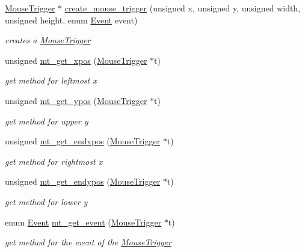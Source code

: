 \begin{DoxyCompactItemize}
\item 
\hyperlink{structMouseTrigger}{Mouse\+Trigger} $\ast$ \hyperlink{group__MouseTrigger_gafcc865ceabbf0440ed41f6c3efab3883}{create\+\_\+mouse\+\_\+trigger} (unsigned x, unsigned y, unsigned width, unsigned height, enum \hyperlink{group__MouseTrigger_ga5667b805d857c6d28f83f6038a0272d3}{Event} event)
\begin{DoxyCompactList}\small\item\em creates a \hyperlink{structMouseTrigger}{Mouse\+Trigger} \end{DoxyCompactList}\item 
unsigned \hyperlink{group__MouseTrigger_gae86488e196565e85859c13a95b6ad4ec}{mt\+\_\+get\+\_\+xpos} (\hyperlink{structMouseTrigger}{Mouse\+Trigger} $\ast$t)
\begin{DoxyCompactList}\small\item\em get method for leftmost x \end{DoxyCompactList}\item 
unsigned \hyperlink{group__MouseTrigger_ga6a8b3f49ac3c8d51c829cb2b988edf18}{mt\+\_\+get\+\_\+ypos} (\hyperlink{structMouseTrigger}{Mouse\+Trigger} $\ast$t)
\begin{DoxyCompactList}\small\item\em get method for upper y \end{DoxyCompactList}\item 
unsigned \hyperlink{group__MouseTrigger_ga8408da28d1d750afae507d52f5047c3b}{mt\+\_\+get\+\_\+endxpos} (\hyperlink{structMouseTrigger}{Mouse\+Trigger} $\ast$t)
\begin{DoxyCompactList}\small\item\em get method for rightmost x \end{DoxyCompactList}\item 
unsigned \hyperlink{group__MouseTrigger_ga6aef780a98bbfc736bac70d1993f60cf}{mt\+\_\+get\+\_\+endypos} (\hyperlink{structMouseTrigger}{Mouse\+Trigger} $\ast$t)
\begin{DoxyCompactList}\small\item\em get method for lower y \end{DoxyCompactList}\item 
enum \hyperlink{group__MouseTrigger_ga5667b805d857c6d28f83f6038a0272d3}{Event} \hyperlink{group__MouseTrigger_gadbbad606bd8d6884d39ecec0e5fdc745}{mt\+\_\+get\+\_\+event} (\hyperlink{structMouseTrigger}{Mouse\+Trigger} $\ast$t)
\begin{DoxyCompactList}\small\item\em get method for the event of the \hyperlink{structMouseTrigger}{Mouse\+Trigger} \end{DoxyCompactList}\item 

\end{DoxyCompactItemize}
